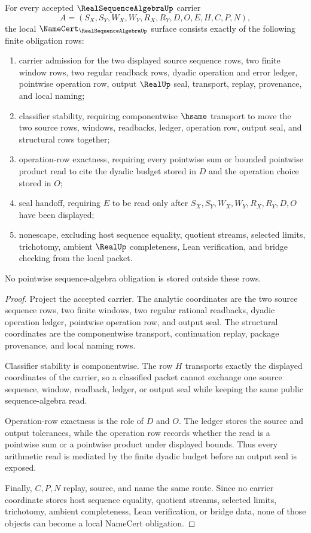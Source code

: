 \begin{theorem}\label{thm:real-sequence-algebra-namecert-obligations}
For every accepted $\RealSequenceAlgebraUp$ carrier
$$
A=(S_X,S_Y,W_X,W_Y,R_X,R_Y,D,O,E,H,C,P,N),
$$
the local $\NameCert_{\RealSequenceAlgebraUp}$ surface consists exactly of the following finite obligation rows:
\begin{enumerate}
\item carrier admission for the two displayed source sequence rows, two finite window rows, two regular readback rows, dyadic operation and error ledger, pointwise operation row, output $\RealUp$ seal, transport, replay, provenance, and local naming;
\item classifier stability, requiring componentwise $\hsame$ transport to move the two source rows, windows, readbacks, ledger, operation row, output seal, and structural rows together;
\item operation-row exactness, requiring every pointwise sum or bounded pointwise product read to cite the dyadic budget stored in $D$ and the operation choice stored in $O$;
\item seal handoff, requiring $E$ to be read only after $S_X,S_Y,W_X,W_Y,R_X,R_Y,D,O$ have been displayed;
\item nonescape, excluding host sequence equality, quotient streams, selected limits, trichotomy, ambient $\RealUp$ completeness, Lean verification, and bridge checking from the local packet.
\end{enumerate}
No pointwise sequence-algebra obligation is stored outside these rows.
\end{theorem}
\begin{proof}
Project the accepted carrier. The analytic coordinates are the two source sequence rows, two finite windows, two regular rational readbacks, dyadic operation ledger, pointwise operation row, and output seal. The structural coordinates are the componentwise transport, continuation replay, package provenance, and local naming rows.

Classifier stability is componentwise. The row $H$ transports exactly the displayed coordinates of the carrier, so a classified packet cannot exchange one source sequence, window, readback, ledger, or output seal while keeping the same public sequence-algebra read.

Operation-row exactness is the role of $D$ and $O$. The ledger stores the source and output tolerances, while the operation row records whether the read is a pointwise sum or a pointwise product under displayed bounds. Thus every arithmetic read is mediated by the finite dyadic budget before an output seal is exposed.

Finally, $C,P,N$ replay, source, and name the same route. Since no carrier coordinate stores host sequence equality, quotient streams, selected limits, trichotomy, ambient completeness, Lean verification, or bridge data, none of those objects can become a local NameCert obligation.
\end{proof}

